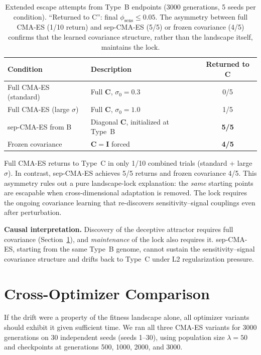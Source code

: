 \documentclass[twoside]{article}
\newcommand{\bC}{\mathbf{C}}
\newcommand{\bI}{\mathbf{I}}
\begin{document}
\begin{table}[t]
\caption{Extended escape attempts from Type~B endpoints (3000 generations,
5 seeds per condition). ``Returned to C'': final $\phi_{\text{sens}} \leq 0.05$.
The asymmetry between full CMA-ES (1/10 return) and sep-CMA-ES (5/5) or
frozen covariance (4/5) confirms that the learned covariance structure,
rather than the landscape itself, maintains the lock.}
\label{tab:interventions}
\centering
\begin{tabular}{llc}
\toprule
Condition & Description & Returned to C \\
\midrule
Full CMA-ES (standard) & Full $\bC$, $\sigma_0 = 0.3$ & 0/5 \\
Full CMA-ES (large $\sigma$) & Full $\bC$, $\sigma_0 = 1.0$ & 1/5 \\
sep-CMA-ES from B & Diagonal $\bC$, initialized at Type~B & \textbf{5/5} \\
Frozen covariance & $\bC = \bI$ forced & \textbf{4/5} \\
\bottomrule
\end{tabular}
\end{table}

Full CMA-ES returns to Type~C in only 1/10 combined trials (standard + large
$\sigma$). In contrast, sep-CMA-ES achieves 5/5 returns and frozen covariance
4/5. This asymmetry rules out a pure landscape-lock explanation: the
\emph{same} starting points are escapable when cross-dimensional adaptation
is removed. The lock requires the ongoing covariance learning that
re-discovers sensitivity--signal couplings even after perturbation.

\textbf{Causal interpretation.} Discovery of the deceptive attractor requires
full covariance (Section~\ref{sec:crossopt}), and \emph{maintenance} of the
lock also requires it. sep-CMA-ES, starting from the same Type~B genome,
cannot sustain the sensitivity--signal covariance structure and drifts back
to Type~C under L2 regularization pressure.

\section{Cross-Optimizer Comparison}
\label{sec:crossopt}

If the drift were a property of the fitness landscape alone, all optimizer
variants should exhibit it given sufficient time. We ran all three CMA-ES
variants for 3000 generations on 30 independent seeds (seeds 1--30),
using population size $\lambda = 50$ and checkpoints at generations
500, 1000, 2000, and 3000.
\end{document}
